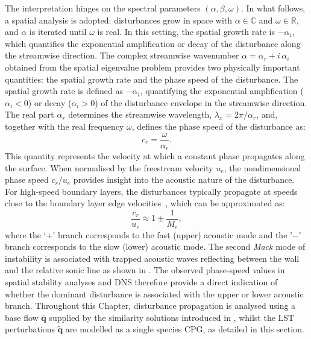 The interpretation hinges on the spectral parameters $(\alpha,\beta,\omega)$. In what follows, a spatial analysis is adopted: disturbances grow in space with $\alpha \in \mathbb{C}$ and $\omega \in \mathbb{R}$, and $\alpha$ is iterated until $\omega$ is real. In this setting, the spatial growth rate is $-\alpha_i$, which quantifies the exponential amplification or decay of the disturbance along the streamwise direction. The complex streamwise wavenumber $\alpha = \alpha_r + i\,\alpha_i$ obtained from the spatial eigenvalue problem provides two physically important quantities: the spatial growth rate and the phase speed of the disturbance. The spatial growth rate is defined as $-\alpha_i$, quantifying the exponential amplification ($\alpha_i < 0$) or decay ($\alpha_i > 0$) of the disturbance envelope in the streamwise direction. The real part $\alpha_r$ determines the streamwise wavelength, $\lambda_x = 2\pi / \alpha_r$, and, together with the real frequency $\omega$, defines the phase speed of the disturbance as:
\begin{equation}
  c_r = \frac{\omega}{\alpha_r}.
\end{equation}
This quantity represents the velocity at which a constant phase propagates along the surface. When normalised by the freestream velocity $u_e$, the nondimensional phase speed $c_r/u_e$ provides insight into the acoustic nature of the disturbance. For high-speed boundary layers, the disturbances typically propagate at speeds close to the boundary layer edge velocities~\citep{Fedorov2011}, which can be approximated as: %
\begin{equation} 
  \frac{c_r}{u_e} \approx 1 \pm \frac{1}{M_e},
\end{equation}
where the `$+$' branch corresponds to the fast (upper) acoustic mode and the '$-$' branch corresponds to the slow (lower) acoustic mode. The second \textit{Mack} mode of instability is associated with trapped acoustic waves reflecting between the wall and the relative sonic line as shown in . The observed phase-speed values in spatial stability analyses and \gls{DNS} therefore provide a direct indication of whether the dominant disturbance is associated with the upper or lower acoustic branch. Throughout this Chapter, disturbance propagation is analysed using a base flow $\bar{\boldsymbol{q}}$ supplied by the similarity solutions introduced in , whilst the \gls{LST} perturbations $\tilde{\boldsymbol{q}}$ are modelled as a single species \gls{CPG}, as detailed in this section.


